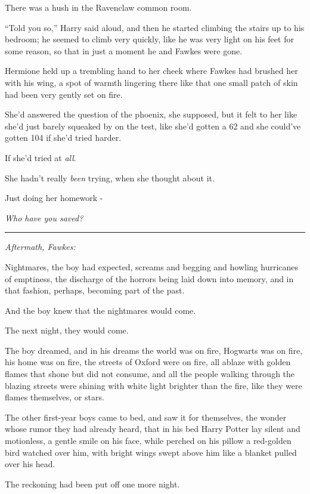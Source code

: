 There was a hush in the Ravenclaw common room.

``Told you so,'' Harry said aloud, and then he started climbing the
stairs up to his bedroom; he seemed to climb very quickly, like he was
very light on his feet for some reason, so that in just a moment he and
Fawkes were gone.

Hermione held up a trembling hand to her cheek where Fawkes had brushed
her with his wing, a spot of warmth lingering there like that one small
patch of skin had been very gently set on fire.

She'd answered the question of the phoenix, she supposed, but it felt to
her like she'd just barely squeaked by on the test, like she'd gotten a
62 and she could've gotten 104 if she'd tried harder.

If she'd tried at \emph{all}.

She hadn't really \emph{been} trying, when she thought about it.

Just doing her homework -

\emph{Who have you saved?}

\begin{center}\rule{3in}{0.4pt}\end{center}

\emph{Aftermath, Fawkes:}

Nightmares, the boy had expected, screams and begging and howling
hurricanes of emptiness, the discharge of the horrors being laid down
into memory, and in that fashion, perhaps, becoming part of the past.

And the boy knew that the nightmares would come.

The next night, they would come.

The boy dreamed, and in his dreams the world was on fire, Hogwarts was
on fire, his home was on fire, the streets of Oxford were on fire, all
ablaze with golden flames that shone but did not consume, and all the
people walking through the blazing streets were shining with white light
brighter than the fire, like they were flames themselves, or stars.

The other first-year boys came to bed, and saw it for themselves, the
wonder whose rumor they had already heard, that in his bed Harry Potter
lay silent and motionless, a gentle smile on his face, while perched on
his pillow a red-golden bird watched over him, with bright wings swept
above him like a blanket pulled over his head.

The reckoning had been put off one more night.

